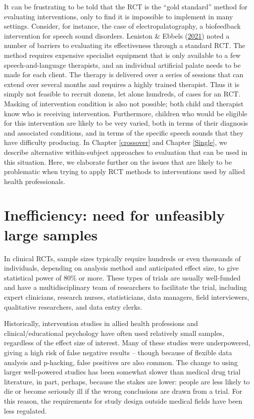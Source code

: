 \documentclass{krantz}
\begin{document}
It can be frustrating to be told that the RCT is the ``gold standard'' method for evaluating interventions, only to find it is impossible to implement in many settings. Consider, for instance, the case of electropalatography, a biofeedback intervention for speech sound disorders. Leniston \& Ebbels (\protect\hyperlink{ref-leniston2021}{2021}) noted a number of barriers to evaluating its effectiveness through a standard RCT. The method requires expensive specialist equipment that is only available to a few speech-and-language therapists, and an individual artificial palate needs to be made for each client. The therapy is delivered over a series of sessions that can extend over several months and requires a highly trained therapist. Thus it is simply not feasible to recruit dozens, let alone hundreds, of cases for an RCT. Masking of intervention condition is also not possible; both child and therapist know who is receiving intervention. Furthermore, children who would be eligible for this intervention are likely to be very varied, both in terms of their diagnosis and associated conditions, and in terms of the specific speech sounds that they have difficulty producing. In Chapter \ref{crossover} and Chapter \ref{Single}, we describe alternative within-subject approaches to evaluation that can be used in this situation. Here, we elaborate further on the issues that are likely to be problematic when trying to apply RCT methods to interventions used by allied health professionals.

\hypertarget{inefficiency-need-for-unfeasibly-large-samples}{%
\section{Inefficiency: need for unfeasibly large samples}\label{inefficiency-need-for-unfeasibly-large-samples}}

In clinical RCTs, sample sizes typically require hundreds or even thousands of individuals, depending on analysis method and anticipated effect size, to give statistical power of 80\% or more. These types of trials are usually well-funded and have a multidisciplinary team of researchers to facilitate the trial, including expert clinicians, research nurses, statisticians, data managers, field interviewers, qualitative researchers, and data entry clerks.

Historically, intervention studies in allied health professions and clinical/educational psychology have often used relatively small samples, regardless of the effect size of interest. Many of these studies were underpowered, giving a high risk of false negative results -- though because of flexible data analysis and p-hacking, false positives are also common. The change to using larger well-powered studies has been somewhat slower than medical drug trial literature, in part, perhaps, because the stakes are lower: people are less likely to die or become seriously ill if the wrong conclusions are drawn from a trial. For this reason, the requirements for study design outside medical fields have been less regulated.
\end{document}
